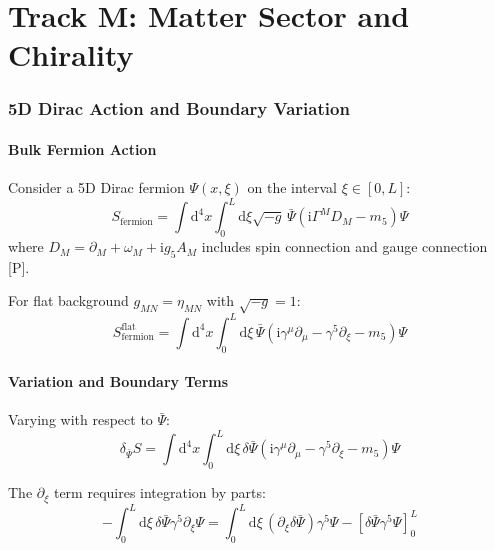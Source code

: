\documentclass[11pt,a4paper]{article}
\newcommand{\dd}{\mathrm{d}}
\newcommand{\ii}{\mathrm{i}}
\begin{document}
\part{Track M: Matter Sector and Chirality}

\section{5D Dirac Action and Boundary Variation}
\label{sec:dirac-action}

\subsection{Bulk Fermion Action}

Consider a 5D Dirac fermion $\Psi(x,\xi)$ on the interval $\xi \in [0,L]$:
\begin{equation}
S_{\text{fermion}} = \int \dd^4x \int_0^L \dd\xi \sqrt{-g}\,
\bar{\Psi}\left(\ii \Gamma^M D_M - m_5\right)\Psi
\label{eq:fermion-action}
\end{equation}
where $D_M = \partial_M + \omega_M + \ii g_5 A_M$ includes spin connection and gauge connection [P].

For flat background $g_{MN} = \eta_{MN}$ with $\sqrt{-g} = 1$:
\begin{equation}
S_{\text{fermion}}^{\text{flat}} = \int \dd^4x \int_0^L \dd\xi\,
\bar{\Psi}\left(\ii \gamma^\mu \partial_\mu - \gamma^5 \partial_\xi - m_5\right)\Psi
\label{eq:fermion-flat}
\end{equation}

\subsection{Variation and Boundary Terms}

Varying with respect to $\bar{\Psi}$:
\begin{equation}
\delta_{\bar{\Psi}} S = \int \dd^4x \int_0^L \dd\xi\,
\delta\bar{\Psi}\left(\ii \gamma^\mu \partial_\mu - \gamma^5 \partial_\xi - m_5\right)\Psi
\label{eq:fermion-var1}
\end{equation}

The $\partial_\xi$ term requires integration by parts:
\begin{equation}
-\int_0^L \dd\xi\, \delta\bar{\Psi} \gamma^5 \partial_\xi \Psi
= \int_0^L \dd\xi\, (\partial_\xi \delta\bar{\Psi}) \gamma^5 \Psi
- \left[\delta\bar{\Psi} \gamma^5 \Psi\right]_0^L
\label{eq:ibp-fermion}
\end{equation}
\end{document}
